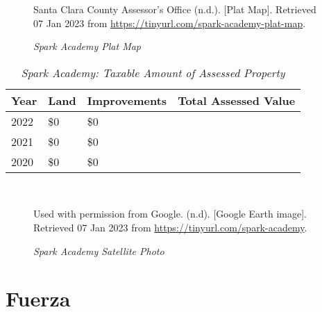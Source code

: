 \begin{figure}[hbtp]
  \caption[Spark Academy Plat Map]{\textit{Spark Academy Plat Map}}%
  \label{fig:spark-academy-plat-map}
  {Santa Clara County Assessor's Office (n.d.). [Plat Map]. Retrieved 07 Jan 2023 from  \url{https://tinyurl.com/spark-academy-plat-map}.}
    
  \end{figure}

\begin{table}[hbtp]
  \SingleSpacing%
  \caption[Spark Academy: Taxable Amount of Assessed Propery]{\textit{Spark Academy: Taxable Amount of Assessed Property}}%
  \label{tab:spark-academy-taxable-amount}
  \begin{tabular}{llll}
    \toprule
    Year & Land        & Improvements & Total Assessed Value \\
    \midrule
    2022 & \$0         & \$0          & \\
    2021 & \$0         & \$0          & \\
    2020 & \$0         & \$0          & \\
    \bottomrule
  \end{tabular}\\
\end{table}

\begin{figure}[hbtp]
  \caption[Spark Academy Satellite Photo] {\textit{Spark Academy Satellite Photo}}%
  \label{fig:spark-academy-sat-photo}
  {Used with permission from Google. (n.d). [Google Earth image]. Retrieved 07 Jan 2023 from \url{https://tinyurl.com/spark-academy}.}
\end{figure}


\clearpage

\section{Fuerza }\label{sec:fuerza-info}\indent

